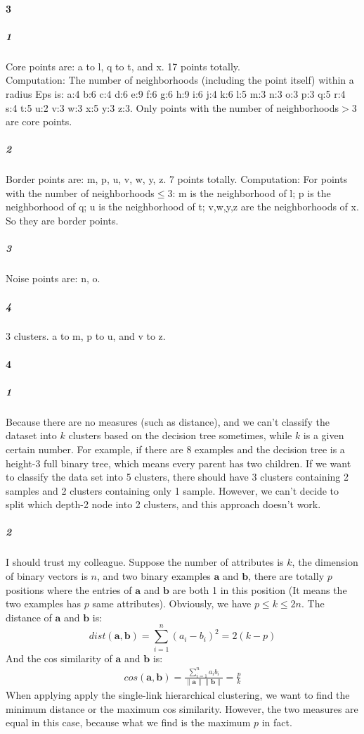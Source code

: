 \documentclass[22pt]{article}
\begin{document}
	\paragraph{3} 
		\subparagraph{1} Core points are: a to l, q to t, and x. 17 points totally.\\
		Computation: The number of neighborhoods (including
		the point itself) within a radius Eps is:
		a:4 b:6 c:4 d:6 e:9 f:6 g:6 h:9 i:6 j:4 k:6 l:5 m:3 n:3 o:3 p:3 q:5 r:4 s:4 t:5 u:2 v:3 w:3 x:5 y:3 z:3. Only points with the number of neighborhoods$>3$ are core points.

		\subparagraph{2} Border points are: m, p, u, v, w, y, z. 7 points totally.
		Computation: For points with the number of neighborhoods$\leq 3$: m is the neighborhood of l; p is the neighborhood of q; u is the neighborhood of t; v,w,y,z are the neighborhoods of x. So they are border points.

		\subparagraph{3} Noise points are: n, o.

		\subparagraph{4} 3 clusters. a to m, p to u, and v to z.


	\paragraph{4}
		\subparagraph{1} Because there are no measures (such as distance), and we can't classify the dataset into $k$ clusters based on the decision tree sometimes, while $k$ is a given certain number. For example, if there are 8 examples and the decision tree is a height-3 full binary tree, which means every parent has two children. If we want to classify the data set into 5 clusters, there should have 3 clusters containing 2 samples and 2 clusters containing only 1 sample. However, we can't decide to split which depth-2 node into 2 clusters, and this approach doesn't work.

		\subparagraph{2} I should trust my colleague. Suppose the number of attributes is $k$, the dimension of binary vectors is $n$, and two binary examples $\mathbf{a}$ and $\mathbf{b}$, there are totally $p$ positions where the entries of $\mathbf{a}$ and $\mathbf{b}$ are both 1 in this position (It means the two examples has $p$ same attributes). Obviously, we have $p\leq k\leq 2n$. The distance of $\mathbf{a}$ and $\mathbf{b}$ is:
		\begin{equation}
			dist(\mathbf{a},\mathbf{b}) = \sum\limits^n_{i=1}(a_i-b_i)^2 = 2(k-p)
		\end{equation}
		And the cos similarity of $\mathbf{a}$ and $\mathbf{b}$ is:
		\begin{align}
			cos(\mathbf{a},\mathbf{b}) =  \frac{\sum\limits^n_{i=1}a_ib_i}{\|\mathbf{a}\|\|\mathbf{b}\|} = \frac{p}{k}
		\end{align}
		When applying apply the single-link hierarchical clustering, we want to find the minimum distance or the maximum cos similarity. However, the two measures are equal in this case, because what we find is the maximum $p$ in fact.
\end{document}
